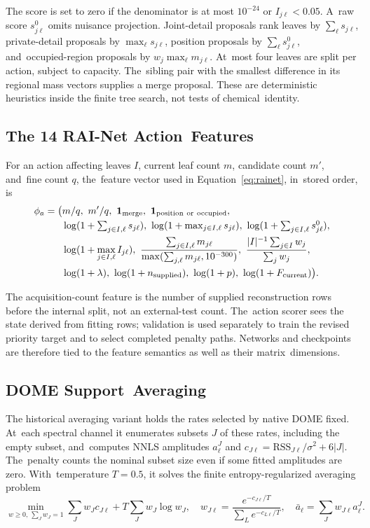 \documentclass[mathematics,article,accept,moreauthors]{Definitions/mdpi}
\newcommand{\one}{\mathbf{1}}
\begin{document}
The score is set to zero if the denominator is at most $10^{-24}$ or $I_{j\ell}<0.05$. A~raw score $s^0_{j\ell}$ omits nuisance projection. Joint-detail proposals rank leaves by $\sum_\ell s_{j\ell}$, private-detail proposals by $\max_\ell s_{j\ell}$, position proposals by $\sum_\ell s^0_{j\ell}$, and~occupied-region proposals by $w_j\max_\ell m_{j\ell}$. At~most four leaves are split per action, subject to capacity. The~sibling pair with the smallest difference in its regional mass vectors supplies a merge proposal. These are deterministic heuristics inside the finite tree search, not tests of chemical~identity.

\subsection{The 14 RAI-Net Action~Features}\label{app:netfeatures}
For an action affecting leaves $I$, current leaf count $m$, candidate count $m'$, and~fine count $q$, the~feature vector used in Equation~\eqref{eq:rainet}, in~stored order, is
\begin{align}\label{eq:netfeatures}
 \phi_a=\big(&m/q,\ m'/q,\ \one_{\rm merge},\ \one_{\rm position\ or\ occupied},\nonumber\\
 &\log(1+\textstyle\sum_{j\in I,\ell}s_{j\ell}),\
 \log(1+\max_{j\in I,\ell}s_{j\ell}),\
 \log(1+\textstyle\sum_{j\in I,\ell}s^0_{j\ell}),\nonumber\\
 &\log(1+\max_{j\in I,\ell}I_{j\ell}),\
 \frac{\sum_{j\in I,\ell}m_{j\ell}}{\max(\sum_{j,\ell}m_{j\ell},10^{-300})},\
 \frac{|I|^{-1}\sum_{j\in I}w_j}{\sum_jw_j},\nonumber\\
 &\log(1+\lambda),\ \log(1+n_{\rm supplied}),\ \log(1+p),\ \log(1+F_{\rm current})\big).
\end{align}

The acquisition-count feature is the number of supplied reconstruction rows before the internal split, not an external-test count. The~action scorer sees the state derived from fitting rows; validation is used separately to train the revised priority target and to select completed penalty paths. Networks and checkpoints are therefore tied to the feature semantics as well as their matrix~dimensions.

\subsection{DOME Support~Averaging}\label{app:domeaverage}
The historical averaging variant holds the rates selected by native DOME fixed. At~each spectral channel it enumerates subsets $J$ of these rates, including the empty subset, and~computes NNLS amplitudes $a^{J}_\ell$ and $c_{J\ell}=\mathrm{RSS}_{J\ell}/\sigma^2+6|J|$. The~penalty counts the nominal subset size even if some fitted amplitudes are zero. With~temperature $T=0.5$, it solves the finite entropy-regularized averaging problem
\begin{equation}\label{eq:domeaverage}
 \min_{w\geq0,\,\sum_Jw_J=1}\sum_Jw_Jc_{J\ell}+T\sum_Jw_J\log w_J,
 \quad w_{J\ell}=\frac{e^{-c_{J\ell}/T}}{\sum_Le^{-c_{L\ell}/T}},\quad
 \bar a_\ell=\sum_Jw_{J\ell}a^J_\ell.
\end{equation}
\end{document}
